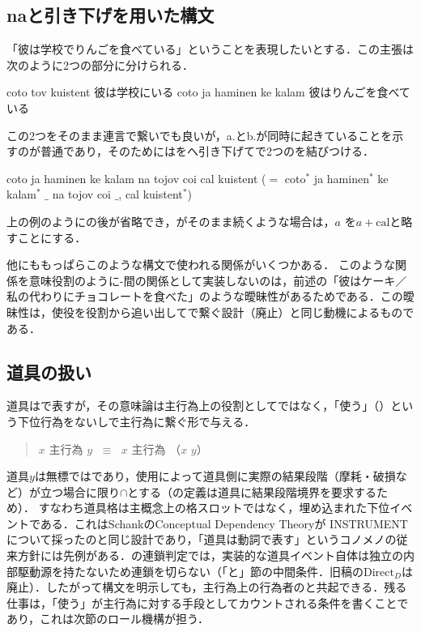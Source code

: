 \documentclass[../../main-detail.tex]{subfiles}
\begin{document}
\subsection{naと引き下げを用いた構文}
「彼は学校でりんごを食べている」ということを表現したいとする．この主張は次のように2つの部分に分けられる．
\begin{exe}
\ex
\begin{xlist}
    \ex coto tov kuistent
    \glt 彼は学校にいる
    \ex coto ja haminen ke kalam
    \glt 彼はりんごを食べている
\end{xlist}
\end{exe}
この2つをそのまま連言で繋いでも良いが，a.とb.が同時に起きていることを示すのが普通であり，そのためにはをへ引き下げてで2つのを結びつける．
\begin{exe}
    \ex coto ja haminen ke kalam na tojov coi cal kuistent ($=$ coto$^*$ ja haminen$^*$ ke kalam$^*$ $\_$ na tojov coi $\_$, cal kuistent$^*$)
\end{exe}
上の例のようにの後が省略でき，がそのまま続くような場合は，$a$  を$a+\text{cal}$と略すことにする．

他にももっぱらこのような構文で使われる関係がいくつかある．
このような関係を意味役割のように-間の関係として実装しないのは，前述の「彼はケーキ／私の代わりにチョコレートを食べた」のような曖昧性があるためである．この曖昧性は，使役を役割から追い出してで繋ぐ設計（廃止）と同じ動機によるものである．

\subsection{道具の扱い}
道具はで表すが，その意味論は主行為上の役割としてではなく，「使う」（）という下位行為をないしで主行為に繋ぐ形で与える．
\begin{quote}
$x$  主行為  $y$ $\;\equiv\;$ $x$  主行為  （$x$    $y$）
\end{quote}
道具$y$は無標ではであり，使用によって道具側に実際の結果段階（摩耗・破損など）が立つ場合に限り$\cap$とする（の定義は道具に結果段階境界を要求するため）．
すなわち道具格は主概念上の格スロットではなく，埋め込まれた下位イベントである．これはSchankのConceptual Dependency Theory\citep{schank1972}が INSTRUMENT について採ったのと同じ設計であり，「道具は動詞で表す」というコノメノの従来方針には先例がある．の連鎖判定では，実装的な道具イベント自体は独立の内部駆動源を持たないため連鎖を切らない（「と」節の中間条件．旧稿の$\mathrm{Direct}_D$は廃止）．したがって構文を明示しても，主行為上の行為者のと共起できる．残る仕事は，「使う」が主行為に対する手段としてカウントされる条件を書くことであり，これは次節のロール機構が担う．
\end{document}

